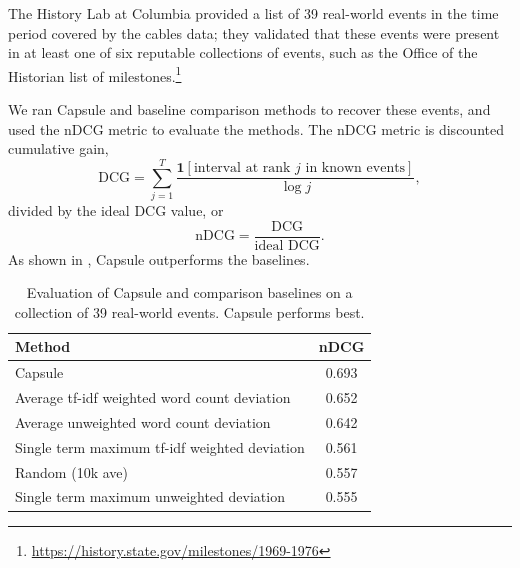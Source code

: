 The History Lab at Columbia provided a list of 39 real-world events in the time period covered by the cables data; they validated that these events were present in at least one of six reputable collections of events, such as the Office of the Historian list of milestones.\footnote{\url{https://history.state.gov/milestones/1969-1976}}

We ran Capsule and baseline comparison methods to recover these events, and used the nDCG metric to evaluate the methods.  The nDCG metric is discounted cumulative gain,
\begin{equation}
\mbox{DCG} = \sum_{j=1}^T \frac{\mathbf{1}[\mbox{interval at rank $j$ in known events}]}{\log j},
\end{equation}
divided by the ideal DCG value, or
\begin{equation}
\mbox{nDCG} = \frac{\mbox{DCG}}{\mbox{ideal DCG}}.
\end{equation}
As shown in , Capsule outperforms the baselines.
\begin{table}[bt]
\centering
\begin{tabular}{l c}
\toprule
\textbf{Method} & \textbf{nDCG} \\
\midrule
Capsule & 0.693 \\
Average tf-idf weighted word count deviation & 0.652 \\
Average unweighted word count deviation & 0.642 \\
Single term maximum tf-idf weighted deviation & 0.561 \\
Random (10k ave) & 0.557 \\
Single term maximum unweighted deviation & 0.555 \\
\bottomrule
\end{tabular}
\caption{Evaluation of Capsule and comparison baselines on a collection of 39 real-world events.  Capsule performs best.}
\label{table:cables:ndcg}
\end{table}

